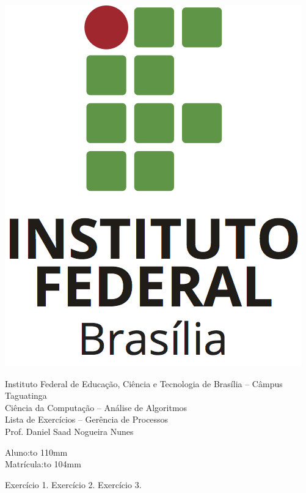 \documentclass[12pt,a4paper]{exam}
\newcommand{\instituto}{Instituto Federal de Educação, Ciência e Tecnologia de Brasília{ }}
\newcommand{\campus}{Câmpus Taguatinga}
\newcommand{\curso}{Ciência da Computação{ }}
\newcommand{\disciplina}{Análise de Algoritmos}
\newcommand{\assunto}{Gerência de Processos}
\newcommand{\professor}{Prof. Daniel Saad Nogueira Nunes}
\newcommand{\cabecalho}{
	
	\instituto -- \campus\\
	\curso -- \disciplina\\
	Lista de Exercícios -- \assunto\\
	\professor
}
\begin{document}
\begin{center}
\includegraphics[scale=0.3]{IFBVertical.png}
\cabecalho
\end{center}


\vspace{5mm}

\begin{minipage}[b]{1.0\linewidth}
  Aluno:\enspace\hbox to 110mm{\hrulefill}\\
  Matrícula:\enspace\hbox to 104mm{\hrulefill}
\end{minipage}

\begin{questions}
	\question Exercício 1.
	\question Exercício 2.
	\question Exercício 3.
\end{questions}
\end{document}

